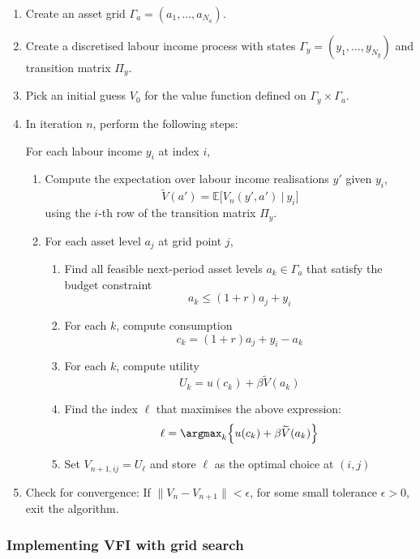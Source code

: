 \documentclass{scrartcl}
\providecommand{\tightlist}{%
      \setlength{\itemsep}{0pt}\setlength{\parskip}{0pt}}
\begin{document}
\begin{enumerate}
\def\labelenumi{\arabic{enumi}.}
\item
  Create an asset grid \(\Gamma_a = (a_1, \dots, a_{N_a})\).
\item
  Create a discretised labour income process with states
  \(\Gamma_y = (y_1, \dots, y_{N_y})\) and transition matrix \(\Pi_y\).
\item
  Pick an initial guess \(V_0\) for the value function defined on
  \(\Gamma_y \times \Gamma_a\).
\item
  In iteration \(n\), perform the following steps:

  For each labour income \(y_i\) at index \(i\),

  \begin{enumerate}
  \def\labelenumii{\arabic{enumii}.}
  \tightlist
  \item
    Compute the expectation over labour income realisations \(y'\) given
    \(y_i\),
    \[ \widetilde{V}(a') = \mathbb{E}\bigl[V_n(y',a')~|~y_i \bigr]\]
    using the \(i\)-th row of the transition matrix \(\Pi_y\).
  \item
    For each asset level \(a_j\) at grid point \(j\),

    \begin{enumerate}
    \def\labelenumiii{\arabic{enumiii}.}
    \tightlist
    \item
      Find all feasible next-period asset levels \(a_k \in \Gamma_a\)
      that satisfy the budget constraint \[a_k \leq (1+r)a_j + y_i\]
    \item
      For each \(k\), compute consumption
      \[c_{k} = (1+r)a_j + y_i - a_k\]
    \item
      For each \(k\), compute utility
      \[U_k = u(c_k) + \beta \widetilde{V}(a_k)\]
    \item
      Find the index \(\ell\) that maximises the above expression:
      \[\ell = \argmax_{k} \Bigl\{ u(c_k) + \beta \widetilde{V}(a_k)\Bigr\}\]
    \item
      Set \(V_{n+1,ij} = U_\ell\) and store \(\ell\) as the optimal
      choice at \((i,j)\)
    \end{enumerate}
  \end{enumerate}
\item
  Check for convergence: If \(\|V_n-V_{n+1}\| < \epsilon\), for some
  small tolerance \(\epsilon > 0\), exit the algorithm.
\end{enumerate}

    \hypertarget{implementing-vfi-with-grid-search}{%
\subsubsection*{Implementing VFI with grid
search}\label{implementing-vfi-with-grid-search}}
\end{document}
